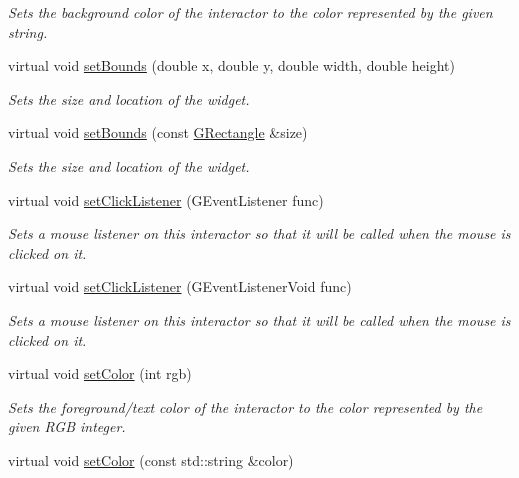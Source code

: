 \begin{DoxyCompactItemize}
\begin{DoxyCompactList}\small\item\em Sets the background color of the interactor to the color represented by the given string. \end{DoxyCompactList}\item 
virtual void \mbox{\hyperlink{classGInteractor_a2aae8197624b72265ab83b4f1bc73f2f}{set\+Bounds}} (double x, double y, double width, double height)
\begin{DoxyCompactList}\small\item\em Sets the size and location of the widget. \end{DoxyCompactList}\item 
virtual void \mbox{\hyperlink{classGInteractor_acada386653f008cacc7cce86426bef7c}{set\+Bounds}} (const \mbox{\hyperlink{structGRectangle}{G\+Rectangle}} \&size)
\begin{DoxyCompactList}\small\item\em Sets the size and location of the widget. \end{DoxyCompactList}\item 
virtual void \mbox{\hyperlink{classGInteractor_abd40af6921242584d0954f173911b190}{set\+Click\+Listener}} (G\+Event\+Listener func)
\begin{DoxyCompactList}\small\item\em Sets a mouse listener on this interactor so that it will be called when the mouse is clicked on it. \end{DoxyCompactList}\item 
virtual void \mbox{\hyperlink{classGInteractor_a856414c92df90f56f3877475eb3f8fc4}{set\+Click\+Listener}} (G\+Event\+Listener\+Void func)
\begin{DoxyCompactList}\small\item\em Sets a mouse listener on this interactor so that it will be called when the mouse is clicked on it. \end{DoxyCompactList}\item 
virtual void \mbox{\hyperlink{classGInteractor_ab1f5cc0f5cc6bbbd716a526c61f1081d}{set\+Color}} (int rgb)
\begin{DoxyCompactList}\small\item\em Sets the foreground/text color of the interactor to the color represented by the given R\+GB integer. \end{DoxyCompactList}\item 
virtual void \mbox{\hyperlink{classGInteractor_a61374df6c11b52cfbb0815decdbaebc6}{set\+Color}} (const std\+::string \&color)

\end{DoxyCompactItemize}
